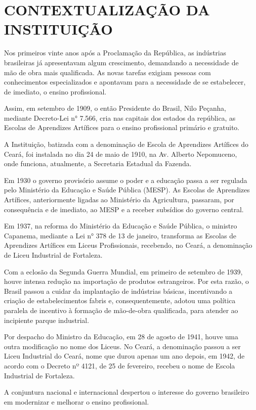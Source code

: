 \clearpage
\section{CONTEXTUALIZAÇÃO DA INSTITUIÇÃO}
Nos primeiros vinte anos após a Proclamação da República, as indústrias brasileiras já apresentavam algum crescimento, demandando a necessidade de mão de obra mais qualificada. As novas tarefas exigiam pessoas com conhecimentos especializados e apontavam para a necessidade de se estabelecer, de imediato, o ensino profissional.

Assim, em setembro de 1909, o então Presidente do Brasil, Nilo Peçanha, mediante Decreto-Lei n° 7.566, cria nas capitais dos estados da república, as Escolas de Aprendizes Artífices para o ensino profissional primário e gratuito.

A Instituição, batizada com a denominação de Escola de Aprendizes Artífices do Ceará, foi instalada no dia 24 de maio de 1910, na Av. Alberto Nepomuceno, onde funciona, atualmente, a Secretaria Estadual da Fazenda.

Em 1930 o governo provisório assume o poder e a educação passa a ser regulada pelo Ministério da Educação e Saúde Pública (MESP). As Escolas de Aprendizes Artífices, anteriormente ligadas ao Ministério da Agricultura, passaram, por consequência e de imediato, ao MESP e a receber subsídios do governo central.

Em 1937, na reforma do Ministério da Educação e Saúde Pública, o ministro Capanema, mediante a Lei n° 378 de 13 de janeiro, transforma as Escolas de Aprendizes Artífices em Liceus Profissionais, recebendo, no Ceará, a denominação de Liceu Industrial de Fortaleza.

Com a eclosão da Segunda Guerra Mundial, em primeiro de setembro de 1939, houve intensa redução na importação de produtos estrangeiros. Por esta razão, o Brasil passou a cuidar da implantação de indústrias básicas, incentivando a criação de estabelecimentos fabris e, consequentemente, adotou uma política paralela de incentivo à formação de mão-de-obra qualificada, para atender ao incipiente parque industrial.

Por despacho do Ministro da Educação, em 28 de agosto de 1941, houve uma outra modificação no nome dos Liceus. No Ceará, a denominação passou a ser Liceu Industrial do Ceará, nome que durou apenas um ano depois, em 1942, de acordo com o Decreto nº 4121, de 25 de fevereiro, recebeu o nome de Escola Industrial de Fortaleza.

A conjuntura nacional e internacional despertou o interesse do governo brasileiro em modernizar e melhorar o ensino profissional.

